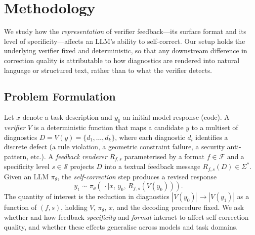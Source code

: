 \section{Methodology}
\label{sec:method}

We study how the \emph{representation} of verifier feedback---its surface format and its level of specificity---affects an LLM's ability to self-correct. Our setup holds the underlying verifier fixed and deterministic, so that any downstream difference in correction quality is attributable to how diagnostics are rendered into natural language or structured text, rather than to what the verifier detects.

\subsection{Problem Formulation}
\label{sec:problem}

Let $x$ denote a task description and $y_0$ an initial model response (code). A \emph{verifier} $V$ is a deterministic function that maps a candidate $y$ to a multiset of diagnostics $D = V(y) = \{d_1, \ldots, d_k\}$, where each diagnostic $d_i$ identifies a discrete defect (a rule violation, a geometric constraint failure, a security anti-pattern, etc.). A \emph{feedback renderer} $R_{f,s}$ parameterised by a format $f \in \mathcal{F}$ and a specificity level $s \in \mathcal{S}$ projects $D$ into a textual feedback message $R_{f,s}(D) \in \Sigma^*$. Given an LLM $\pi_\theta$, the \emph{self-correction} step produces a revised response
\begin{equation}
    y_1 \sim \pi_\theta\!\left(\,\cdot \mid x,\, y_0,\, R_{f,s}(V(y_0))\right).
\end{equation}
The quantity of interest is the reduction in diagnostics $|V(y_0)| \rightarrow |V(y_1)|$ as a function of $(f,s)$, holding $V$, $\pi_\theta$, $x$, and the decoding procedure fixed. We ask whether and how feedback \emph{specificity} and \emph{format} interact to affect self-correction quality, and whether these effects generalise across models and task domains.

